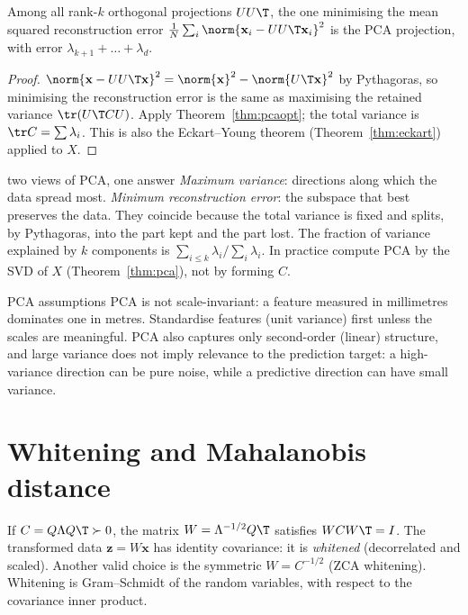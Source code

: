 \begin{theorem}\label{thm:pcarecon}
Among all rank-$k$ orthogonal projections $UU\T$, the one minimising the mean squared reconstruction error $\frac1N\sum_i\norm{\mathbf{x}_i-UU\T\mathbf{x}_i}^2$ is the PCA projection, with error $\lambda_{k+1}+\dots+\lambda_d$.
\end{theorem}

\begin{proof}
$\norm{\mathbf{x}-UU\T\mathbf{x}}^2=\norm{\mathbf{x}}^2-\norm{U\T\mathbf{x}}^2$ by Pythagoras, so minimising the reconstruction error is the same as maximising the retained variance $\tr(U\T CU)$. Apply Theorem~\ref{thm:pcaopt}; the total variance is $\tr C=\sum\lambda_i$. This is also the Eckart--Young theorem (Theorem~\ref{thm:eckart}) applied to $X$.
\end{proof}

\begin{interview}{two views of PCA, one answer}
\emph{Maximum variance}: directions along which the data spread most. \emph{Minimum reconstruction error}: the subspace that best preserves the data. They coincide because the total variance is fixed and splits, by Pythagoras, into the part kept and the part lost. The fraction of variance explained by $k$ components is $\sum_{i\le k}\lambda_i/\sum_i\lambda_i$. In practice compute PCA by the SVD of $X$ (Theorem~\ref{thm:pca}), not by forming $C$.
\end{interview}

\begin{pitfall}{PCA assumptions}
PCA is not scale-invariant: a feature measured in millimetres dominates one in metres. Standardise features (unit variance) first unless the scales are meaningful. PCA also captures only second-order (linear) structure, and large variance does not imply relevance to the prediction target: a high-variance direction can be pure noise, while a predictive direction can have small variance.
\end{pitfall}

\section{Whitening and Mahalanobis distance}

If $C=Q\Lambda Q\T\succ0$, the matrix $W=\Lambda^{-1/2}Q\T$ satisfies $WCW\T=I$. The transformed data $\mathbf{z}=W\mathbf{x}$ has identity covariance: it is \emph{whitened} (decorrelated and scaled). Another valid choice is the symmetric $W=C^{-1/2}$ (ZCA whitening). Whitening is Gram--Schmidt of the random variables, with respect to the covariance inner product.

